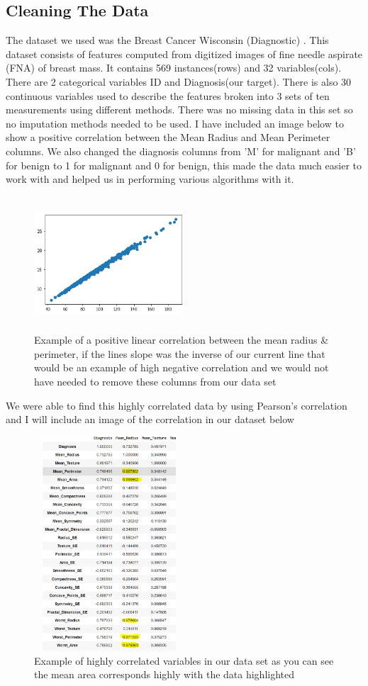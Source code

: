 \documentclass[conference]{IEEEtran}
\begin{document}
\subsection{Cleaning The Data}
The dataset we used was the Breast Cancer Wisconsin (Diagnostic) \cite{misc_breast_cancer_wisconsin_17}. This dataset consists of features computed from digitized images of fine needle aspirate (FNA) of breast mass. It contains 569 instances(rows) and 32 variables(cols). There are 2 categorical variables ID and Diagnosis(our target). There is also 30 continuous variables used to describe the features broken into 3 sets of ten measurements using different methods. There was no missing data in this set so no imputation methods needed to be used.
I have included an image below to show a positive correlation between the Mean Radius and Mean Perimeter columns.  We also changed the diagnosis columns from 'M' for malignant and 'B' for benign to 1 for malignant and 0 for benign, this made the data much easier to work with and helped us in performing various algorithms with it.
\begin{figure}[H] 
\caption{Example of a positive linear correlation between the mean radius \& perimeter, if the lines slope was the inverse of our current line that would be an example of high negative correlation and we would not have needed to remove these columns from our data set}
\centering
\includegraphics[height=50mm,width=0.5\textwidth]{positive_correlation.png}
\end{figure}
We were able to find this highly correlated data by using Pearson's correlation and I will include an image of the correlation in our dataset below
\begin{figure}[H]
\caption{Example of highly correlated variables in our data set as you can see the mean area corresponds highly with the data highlighted}
\centering
\includegraphics[height=80mm,width=0.5\textwidth]{dataset_correlation.PNG}
\end{figure}
\end{document}
